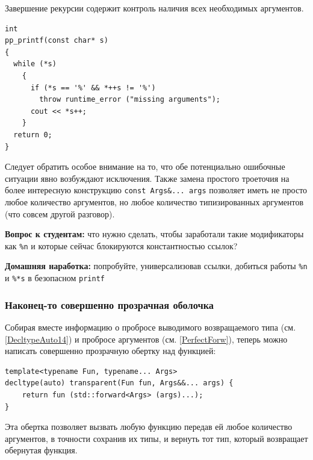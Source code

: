 \documentclass[a4paper,12pt,oneside]{article}
\newif\ifanswers
\begin{document}
Завершение рекурсии содержит контроль наличия всех необходимых аргументов.

\begin{lstlisting}
int
pp_printf(const char* s) 
{
  while (*s) 
    {
      if (*s == '%' && *++s != '%')
        throw runtime_error ("missing arguments");
      cout << *s++;
    }
  return 0;
}
\end{lstlisting}

Следует обратить особое внимание на то, что обе потенциально ошибочные ситуации явно возбуждают исключения. Также замена простого троеточия на более интересную конструкцию \lstinline!const Args&... args! позволяет иметь не просто любое количество аргументов, но любое количество типизированных аргументов (что совсем другой разговор).

\textbf{Вопрос к студентам:} что нужно сделать, чтобы заработали такие модификаторы как \lstinline!%n! и которые сейчас блокируются константностью ссылок?

\ifanswers
Правильный ответ: универсализовать ссылки

\begin{lstlisting}
template<typename T, typename... Args> int
pp_printf(const char* s, T&& value, Args&&... args)
\end{lstlisting}
\fi

\textbf{Домашняя наработка:} попробуйте, универсализовав ссылки, добиться работы \lstinline!%n! и \lstinline!%*s! в безопасном \lstinline!printf!

\subsubsection{Наконец-то совершенно прозрачная оболочка}\label{PerfectCloth}

Собирая вместе информацию о пробросе выводимого возвращаемого типа (см. \ref{DecltypeAuto14}) и пробросе аргументов (см. \ref{PerfectForw}), теперь можно написать совершенно прозрачную обертку над функцией:

\begin{lstlisting}
template<typename Fun, typename... Args>
decltype(auto) transparent(Fun fun, Args&&... args) { 
    return fun (std::forward<Args> (args)...); 
}
\end{lstlisting}

Эта обертка позволяет вызвать любую функцию передав ей любое количество аргументов, в точности сохранив их типы, и вернуть тот тип, который возвращает обернутая функция.
\end{document}
